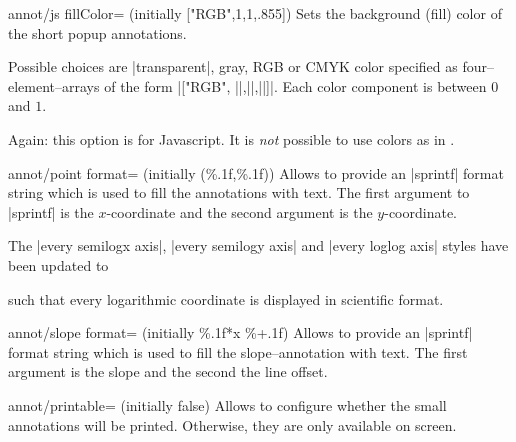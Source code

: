 \begin{pgfplotskey}{annot/js fillColor= (initially ["RGB",1,1,.855])}
	Sets the background (fill) color of the short popup annotations. 
	
	Possible choices are |transparent|, gray, RGB or CMYK color specified as four--element--arrays of the form
	|["RGB", ||,||,||]|. Each color component is between $0$ and $1$.

	Again: this option is for Javascript. It is \emph{not} possible to use colors as in \pgfname.
\end{pgfplotskey}

\begin{pgfplotskey}{annot/point format= (initially {(\%.1f,\%.1f)})}
	Allows to provide an |sprintf| format string which is used to fill the annotations with text. 
	The first argument to |sprintf| is the $x$-coordinate and the second argument is the $y$-coordinate.

	The |every semilogx axis|, |every semilogy axis| and |every loglog axis| styles have been updated to
\begin{codeexample}
\end{codeexample}
	\noindent such that every logarithmic coordinate is displayed in scientific format.
\end{pgfplotskey}

\begin{pgfplotskey}{annot/slope format= (initially \%.1f*x \%+.1f)}
	Allows to provide an |sprintf| format string which is used to fill the slope--annotation with text.
	The first argument is the slope and the second the line offset.
\end{pgfplotskey}

\begin{pgfplotskey}{annot/printable= (initially false)}
	Allows to configure whether the small annotations will be printed. Otherwise, they are only available on screen.
\end{pgfplotskey}

